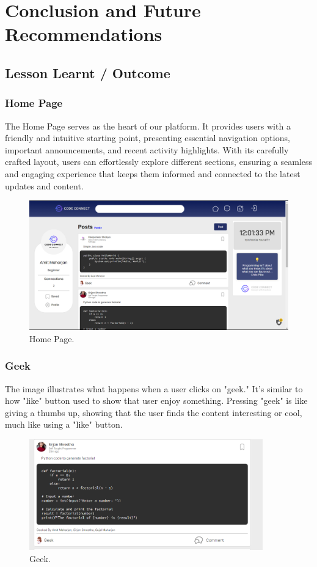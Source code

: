 \chapter{Conclusion and Future Recommendations}

\section{Lesson Learnt / Outcome}

\subsection{Home Page}
The Home Page serves as the heart of our platform. It provides users with a friendly and intuitive starting point, presenting essential navigation options, important announcements, and recent activity highlights. With its carefully crafted layout, users can effortlessly explore different sections, ensuring a seamless and engaging experience that keeps them informed and connected to the latest updates and content.
\begin{figure}[ht]
    \centering
    \includegraphics[width=1\textwidth]{Outcome-ss/homepage.png}
    \caption{Home Page.}
    \label{fig:Home Page}
\end{figure}

\subsection{Geek}
The image illustrates what happens when a user clicks on "geek." It's similar to how "like" button used to show that user enjoy something. Pressing "geek" is like giving a thumbs up, showing that the user finds the content interesting or cool, much like using a "like" button.
\begin{figure}[ht]
    \centering
    \includegraphics[width=0.9\textwidth]{Outcome-ss/geek.png}
    \caption{Geek.}
    \label{fig:Geek}
\end{figure}
\newpage
